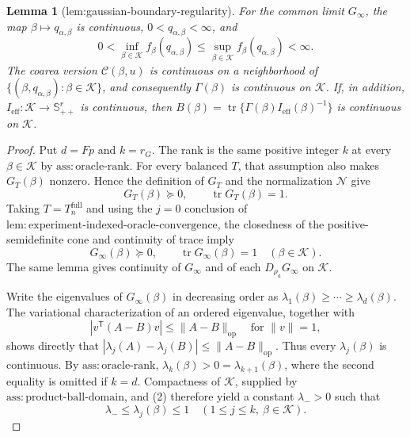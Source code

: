 \documentclass{article}
\newtheorem{lemma}{Lemma}
\begin{document}
\begin{lemma}[lem:gaussian-boundary-regularity]\label{lem:gaussian-boundary-regularity}
For the common limit \(G_{\infty}\), the map \(\beta\mapsto q_{\alpha,\beta}\) is continuous, \(0<q_{\alpha,\beta}<\infty\), and
\[
0<\inf_{\beta\in\mathcal K}f_{\beta}(q_{\alpha,\beta})
\leq\sup_{\beta\in\mathcal K}f_{\beta}(q_{\alpha,\beta})<\infty.
\]
The coarea version \(\mathcal C(\beta,u)\) is continuous on a neighborhood of \(\{(\beta,q_{\alpha,\beta}):\beta\in\mathcal K\}\), and consequently \(\Gamma(\beta)\) is continuous on \(\mathcal K\).  If, in addition, \(I_{\mathrm{eff}}:\mathcal K\to\mathbb S_{++}^r\) is continuous, then \(B(\beta)=\operatorname{tr}\{\Gamma(\beta)I_{\mathrm{eff}}(\beta)^{-1}\}\) is continuous on \(\mathcal K\).
\end{lemma}
\begin{proof}
Put \(d=Fp\) and \(k=r_G\).  The rank is the same positive integer \(k\) at every \(\beta\in\mathcal K\) by \(\mathrm{ass{:}oracle\text{-}rank}\).  For every balanced \(T\), that assumption also makes \(G_T(\beta)\) nonzero.  Hence the definition of \(G_T\) and the normalization \(\mathcal N\) give
\[
G_T(\beta)\succeq0,
\qquad \operatorname{tr}G_T(\beta)=1.
\tag{1}
\]
Taking \(T=T_n^{\mathrm{full}}\) and using the \(j=0\) conclusion of \(\mathrm{lem{:}experiment\text{-}indexed\text{-}oracle\text{-}convergence}\), the closedness of the positive-semidefinite cone and continuity of trace imply
\[
G_\infty(\beta)\succeq0,
\qquad \operatorname{tr}G_\infty(\beta)=1
\quad(\beta\in\mathcal K).
\tag{2}
\]
The same lemma gives continuity of \(G_\infty\) and of each \(D_{\rho_a}G_\infty\) on \(\mathcal K\).

Write the eigenvalues of \(G_\infty(\beta)\) in decreasing order as
\(\lambda_1(\beta)\ge\cdots\ge\lambda_d(\beta)\).  The variational characterization of an ordered eigenvalue, together with
\[
\left|v^{\mathsf T}(A-B)v\right|\leq\lVert A-B\rVert_{\mathrm{op}}
\quad\text{for }\lVert v\rVert=1,
\tag{3}
\]
shows directly that
\(\left|\lambda_j(A)-\lambda_j(B)\right|\leq\lVert A-B\rVert_{\mathrm{op}}\).  Thus every \(\lambda_j(\beta)\) is continuous.  By \(\mathrm{ass{:}oracle\text{-}rank}\),
\(\lambda_k(\beta)>0=\lambda_{k+1}(\beta)\), where the second equality is omitted if \(k=d\).  Compactness of \(\mathcal K\), supplied by \(\mathrm{ass{:}product\text{-}ball\text{-}domain}\), and (2) therefore yield a constant \(\lambda_->0\) such that
\[
\lambda_-\leq\lambda_j(\beta)\leq1
\quad(1\leq j\leq k,\ \beta\in\mathcal K).
\tag{4}
\]


\end{proof}
\end{document}
